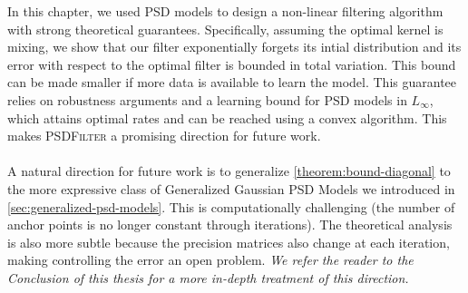 In this chapter, we used PSD models to design a non-linear filtering algorithm with strong theoretical guarantees. Specifically, assuming the optimal kernel is mixing, we show that our filter exponentially forgets its intial distribution and its error with respect to the optimal filter is bounded in total variation. This bound can be made smaller if more data is available to learn the model. This guarantee relies on robustness arguments and a learning bound for PSD models in $L_\infty$, which attains optimal rates and can be reached using a convex algorithm. This makes \textsc{PSDFilter} a promising direction for future work.

\paragraph{}
A natural direction for future work is to generalize \cref{theorem:bound-diagonal} to the more expressive class of Generalized Gaussian PSD Models we introduced in \cref{sec:generalized-psd-models}. This is computationally challenging (the number of anchor points is no longer constant through iterations). The theoretical analysis is also more subtle because the precision matrices also change at each iteration, making controlling the error an open problem. \emph{We refer the reader to the Conclusion of this thesis for a more in-depth treatment of this direction.}
